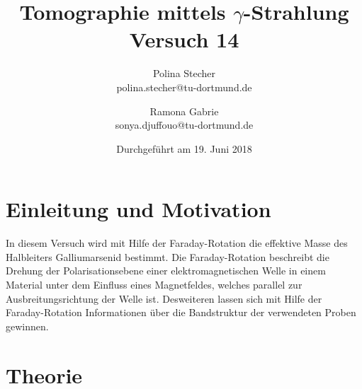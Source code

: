 \documentclass{article}
\begin{document}
	\scriptsize \normalsize
	\title{ Tomographie mittels $\gamma$-Strahlung  \\ Versuch 14}
	

	
	\author{Polina Stecher\\ {polina.stecher@tu-dortmund.de}  \and   Ramona Gabrie\\ {sonya.djuffouo@tu-dortmund.de}} %
	\date{Durchgeführt am  19. Juni  2018}
		\maketitle
	\newpage
	\tableofcontents
	\thispagestyle{empty}
	\newpage
	\newpage
	
\section{Einleitung und Motivation}

In diesem Versuch wird mit Hilfe der Faraday-Rotation die effektive Masse des Halbleiters Galliumarsenid bestimmt. Die Faraday-Rotation beschreibt die Drehung der Polarisationsebene einer elektromagnetischen Welle in einem Material unter dem Einfluss eines Magnetfeldes, welches parallel zur Ausbreitungsrichtung der Welle ist. Desweiteren lassen sich mit Hilfe der Faraday-Rotation Informationen über die Bandstruktur der verwendeten Proben gewinnen. 

\section{Theorie}
\end{document}
